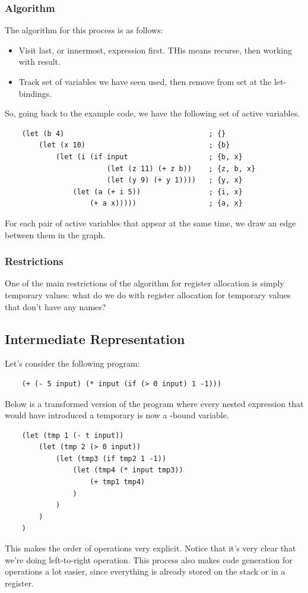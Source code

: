 \subsubsection{Algorithm}
The algorithm for this process is as follows: 
\begin{itemize}
    \item Visit last, or innermost, expression first. THis means recurse, then working with result. 
    \item Track set of variables we have seen used, then remove from set at the let-bindings.
\end{itemize}
So, going back to the example code, we have the following set of active variables.
\begin{verbatim}
    (let (b 4)                                  ; {}
        (let (x 10)                             ; {b}
            (let (i (if input                   ; {b, x}
                        (let (z 11) (+ z b))    ; {z, b, x}
                        (let (y 9) (+ y 1))))   ; {y, x}
                (let (a (+ i 5))                ; {i, x}
                    (+ a x)))))                 ; {a, x}\end{verbatim}
For each pair of active variables that appear at the same time, we draw an edge between them in the graph.

\subsubsection{Restrictions}
One of the main restrictions of the algorithm for register allocation is simply temporary values: what do we do with register allocation for temporary values that don't have any names?

\subsection{Intermediate Representation}
Let's consider the following program:
\begin{verbatim}
    (+ (- 5 input) (* input (if (> 0 input) 1 -1)))\end{verbatim}
Below is a transformed version of the program where every nested expression that would have introduced a temporary is now a -bound variable. 
\begin{verbatim}
    (let (tmp 1 (- t input))
        (let (tmp 2 (> 0 input))
            (let (tmp3 (if tmp2 1 -1))
                (let (tmp4 (* input tmp3))
                    (+ tmp1 tmp4)
                )
            )
        )
    )\end{verbatim}
This makes the order of operations very explicit. Notice that it's very clear that we're doing left-to-right operation. This process also makes code generation for operations a lot easier, since everything is already stored on the stack or in a register. 

